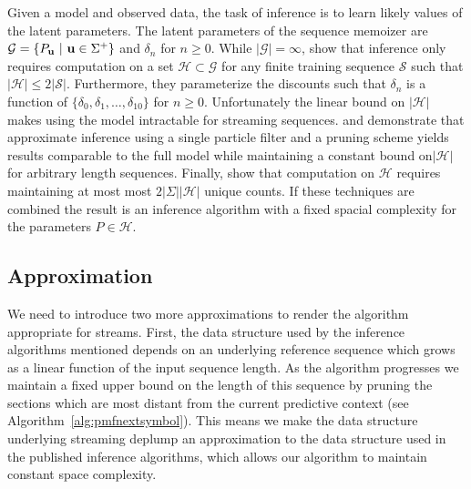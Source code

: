 Given a model and observed data,  the task of inference is to learn likely values of the latent parameters.  The latent parameters of the sequence memoizer are  $\mathcal{G} = \{P_{\bf u} \ | \ {\bf u} \in \Sigma^{+} \}$ and $\delta_n$ for $n \geq 0$.  While $| \mathcal{G}| = \infty$, \citep{Wood2009} show that inference only requires computation on a set $\mathcal{H} \subset \mathcal{G}$ for any finite training sequence $\mathcal{S}$ such that $|\mathcal{H} | \leq 2 |\mathcal{S}|$.  Furthermore, they parameterize the discounts such that $\delta_n$ is a function of $\{\delta_0, \delta_1, \ldots, \delta_{10} \}$ for $n \geq 0$.   Unfortunately the linear bound on $|\mathcal{H}|$ makes using the model intractable for streaming sequences. \citep{Bartlett2010} and \citep{Gasthaus2010} demonstrate that approximate inference using a single particle filter and a pruning scheme yields results comparable to the full model while maintaining a constant bound on$| \mathcal{H}| $ for arbitrary length sequences.  Finally, \cite{Gasthaus2011} show that computation on $\mathcal{H}$ requires maintaining at most most $2|\Sigma| |\mathcal{H}|$ unique counts.  If these techniques are combined the result is an inference algorithm with a fixed spacial complexity for the parameters $P \in \mathcal{H}$.  

%
\subsection{Approximation}

We need to introduce two more approximations to render the algorithm appropriate for streams.  First, the data structure used by the inference algorithms mentioned depends on an underlying reference sequence which grows as a linear function of the input sequence length.  As the algorithm progresses we maintain a fixed upper bound on the length of this sequence by pruning the sections which are most distant from the current predictive context (see Algorithm~\ref{alg:pmfnextsymbol}).  This means we make the data structure underlying streaming deplump an approximation to the data structure used in the published inference algorithms, which allows our algorithm to maintain constant space complexity.

